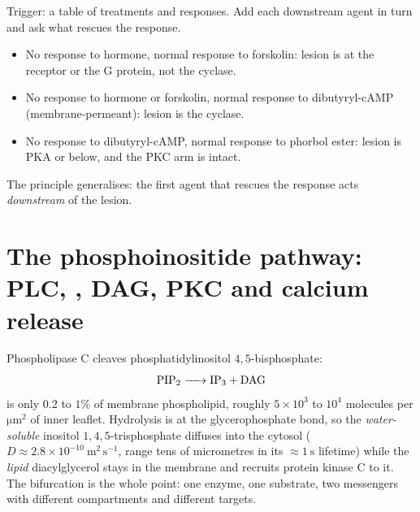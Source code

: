 \begin{tipbox}[title={TECHNIQUE: locate the lesion in a cascade}]
Trigger: a table of treatments and responses. Add each downstream agent in turn and
ask what rescues the response.
\begin{itemize}
\item No response to hormone, normal response to forskolin: lesion is at the
receptor or the G protein, not the cyclase.
\item No response to hormone or forskolin, normal response to
dibutyryl-cAMP (membrane-permeant): lesion is the cyclase.
\item No response to dibutyryl-cAMP, normal response to phorbol ester: lesion is PKA
or below, and the PKC arm is intact.
\end{itemize}
The principle generalises: the first agent that rescues the response acts
\emph{downstream} of the lesion.
\end{tipbox}

\section{The phosphoinositide pathway: PLC, , DAG, PKC and calcium release}

\begin{keybox}[title={MEMORIZE: one lipid, two messengers}]
Phospholipase C cleaves phosphatidylinositol $4,5$-bisphosphate:
\[
\ce{PIP2 -> IP3 + DAG}
\]
 is only $0.2$ to $1\%$ of membrane phospholipid, roughly
$5\times10^{3}$ to $10^{4}$ molecules per $\mathrm{\mu m^2}$ of inner leaflet.
Hydrolysis is at the glycerophosphate bond, so the \emph{water-soluble} inositol
$1,4,5$-trisphosphate diffuses into the cytosol ($D\approx 2.8\times
10^{-10}\ \mathrm{m^2\,s^{-1}}$, range tens of micrometres in its $\approx1\ \mathrm{s}$
lifetime) while the \emph{lipid} diacylglycerol stays in the membrane and recruits
protein kinase C to it. The bifurcation is the whole point: one enzyme, one
substrate, two messengers with different compartments and different targets.
\end{keybox}

